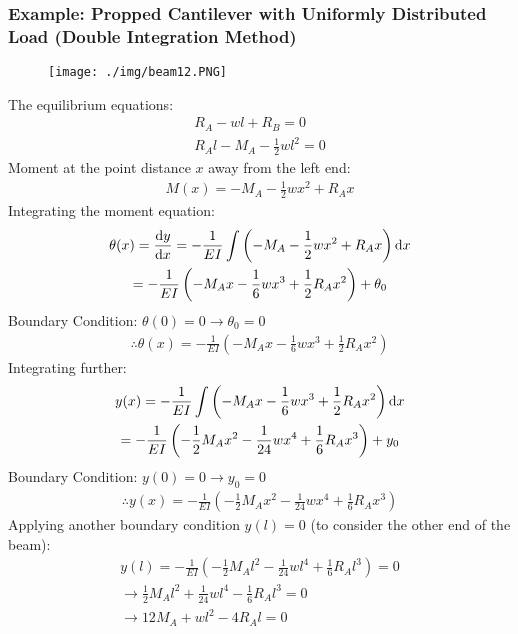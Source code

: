 \subsubsection{Example: Propped Cantilever with Uniformly Distributed Load (Double Integration Method)}
\begin{figure}[H]
  \centering
  \texttt{[image: ./img/beam12.PNG]}
\end{figure}
The equilibrium equations:
\begin{gather}
  R_A-wl+R_B = 0 \\
  R_Al-M_A-\frac{1}{2}wl^2 = 0
\end{gather}
Moment at the point distance $x$ away from the left end:
\begin{gather}
  M(x) = -M_A-\frac{1}{2}wx^2+R_Ax
\end{gather}
Integrating the moment equation:
\begin{gather}
  \theta(x) = \frac{\dif y}{\dif x} = -\frac{1}{EI}\int\left(-M_A-\frac{1}{2}wx^2+R_Ax\right)\dif x \\
  = -\frac{1}{EI}\left(-M_Ax-\frac{1}{6}wx^3+\frac{1}{2}R_Ax^2\right) + \theta_0
\end{gather}
Boundary Condition: $\theta(0) = 0 \longrightarrow \theta_0 = 0$
\begin{gather}
  \therefore \theta(x) = -\frac{1}{EI}\left(-M_Ax-\frac{1}{6}wx^3+\frac{1}{2}R_Ax^2\right)
\end{gather}
Integrating further:
\begin{gather}
  y(x) = -\frac{1}{EI}\int\left(-M_Ax-\frac{1}{6}wx^3+\frac{1}{2}R_Ax^2\right)\dif x \\
  = -\frac{1}{EI}\left(-\frac{1}{2}M_Ax^2-\frac{1}{24}wx^4+\frac{1}{6}R_Ax^3\right) + y_0
\end{gather}
Boundary Condition: $y(0) = 0 \longrightarrow y_0 = 0$
\begin{gather}
  \therefore y(x) = -\frac{1}{EI}\left(-\frac{1}{2}M_Ax^2-\frac{1}{24}wx^4+\frac{1}{6}R_Ax^3\right)
\end{gather}
Applying another boundary condition $y(l) = 0$ (to consider the other end of the beam):
\begin{gather}
  y(l) = -\frac{1}{EI}\left(-\frac{1}{2}M_Al^2-\frac{1}{24}wl^4+\frac{1}{6}R_Al^3\right) = 0 \\
  \longrightarrow \frac{1}{2}M_Al^2+\frac{1}{24}wl^4-\frac{1}{6}R_Al^3 = 0 \\
  \longrightarrow 12M_A + wl^2 - 4R_Al = 0
  \label{doubleintegration}
\end{gather}
